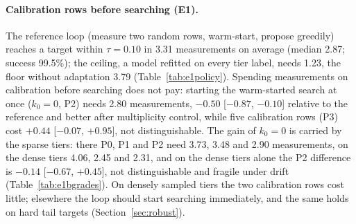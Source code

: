 \documentclass[11pt,a4paper]{article}
\begin{document}
\paragraph{Calibration rows before searching (E1).} The reference loop (measure two random rows,
warm-start, propose greedily) reaches a target within $\tau = 0.10$ in 3.31 measurements on
average (median 2.87; success 99.5\%); the ceiling, a model refitted on every
tier label, needs 1.23, the floor without adaptation 3.79
(Table~\ref{tab:e1policy}). Spending measurements on calibration before searching does not pay:
starting the warm-started search at once ($k_0 = 0$, P2) needs 2.80 measurements,
$-0.50$ [$-0.87$, $-0.10$] relative to the reference and better after multiplicity control, while five
calibration rows (P3) cost $+0.44$ [$-0.07$, $+0.95$], not distinguishable. The gain of $k_0 = 0$ is
carried by the sparse tiers: there P0, P1 and P2 need 3.73, 3.48 and
2.90 measurements, on the dense tiers 4.06, 2.45 and 2.31,
and on the dense tiers alone the P2 difference is $-0.14$ [$-0.67$, $+0.45$], not
distinguishable and fragile under drift (Table~\ref{tab:e1bgrades}). On densely sampled tiers the
two calibration rows cost little; elsewhere the loop should start searching immediately, and the
same holds on hard tail targets (Section~\ref{sec:robust}).
\end{document}
